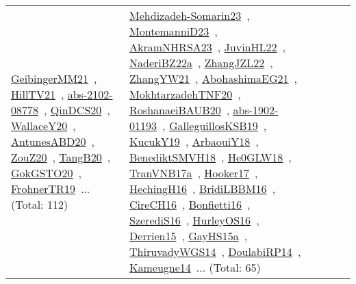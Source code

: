{\begin{longtable}{lp{3cm}>{\raggedright\arraybackslash}p{6cm}>{\raggedright\arraybackslash}p{6cm}>{\raggedright\arraybackslash}p{8cm}}
\href{../works/GeibingerMM21.pdf}{GeibingerMM21}~\cite{GeibingerMM21}, \href{../works/HillTV21.pdf}{HillTV21}~\cite{HillTV21}, \href{../works/abs-2102-08778.pdf}{abs-2102-08778}~\cite{abs-2102-08778}, \href{../works/QinDCS20.pdf}{QinDCS20}~\cite{QinDCS20}, \href{../works/WallaceY20.pdf}{WallaceY20}~\cite{WallaceY20}, \href{../works/AntunesABD20.pdf}{AntunesABD20}~\cite{AntunesABD20}, \href{../works/ZouZ20.pdf}{ZouZ20}~\cite{ZouZ20}, \href{../works/TangB20.pdf}{TangB20}~\cite{TangB20}, \href{../works/GokGSTO20.pdf}{GokGSTO20}~\cite{GokGSTO20}, \href{../works/FrohnerTR19.pdf}{FrohnerTR19}~\cite{FrohnerTR19}... (Total: 112) & \href{../works/Mehdizadeh-Somarin23.pdf}{Mehdizadeh-Somarin23}~\cite{Mehdizadeh-Somarin23}, \href{../works/MontemanniD23.pdf}{MontemanniD23}~\cite{MontemanniD23}, \href{../works/AkramNHRSA23.pdf}{AkramNHRSA23}~\cite{AkramNHRSA23}, \href{../works/JuvinHL22.pdf}{JuvinHL22}~\cite{JuvinHL22}, \href{../works/NaderiBZ22a.pdf}{NaderiBZ22a}~\cite{NaderiBZ22a}, \href{../works/ZhangJZL22.pdf}{ZhangJZL22}~\cite{ZhangJZL22}, \href{../works/ZhangYW21.pdf}{ZhangYW21}~\cite{ZhangYW21}, \href{../works/AbohashimaEG21.pdf}{AbohashimaEG21}~\cite{AbohashimaEG21}, \href{../works/MokhtarzadehTNF20.pdf}{MokhtarzadehTNF20}~\cite{MokhtarzadehTNF20}, \href{../works/RoshanaeiBAUB20.pdf}{RoshanaeiBAUB20}~\cite{RoshanaeiBAUB20}, \href{../works/abs-1902-01193.pdf}{abs-1902-01193}~\cite{abs-1902-01193}, \href{../works/GalleguillosKSB19.pdf}{GalleguillosKSB19}~\cite{GalleguillosKSB19}, \href{../works/KucukY19.pdf}{KucukY19}~\cite{KucukY19}, \href{../works/ArbaouiY18.pdf}{ArbaouiY18}~\cite{ArbaouiY18}, \href{../works/BenediktSMVH18.pdf}{BenediktSMVH18}~\cite{BenediktSMVH18}, \href{../works/He0GLW18.pdf}{He0GLW18}~\cite{He0GLW18}, \href{../works/TranVNB17a.pdf}{TranVNB17a}~\cite{TranVNB17a}, \href{../works/Hooker17.pdf}{Hooker17}~\cite{Hooker17}, \href{../works/HechingH16.pdf}{HechingH16}~\cite{HechingH16}, \href{../works/BridiLBBM16.pdf}{BridiLBBM16}~\cite{BridiLBBM16}, \href{../works/CireCH16.pdf}{CireCH16}~\cite{CireCH16}, \href{../works/Bonfietti16.pdf}{Bonfietti16}~\cite{Bonfietti16}, \href{../works/SzerediS16.pdf}{SzerediS16}~\cite{SzerediS16}, \href{../works/HurleyOS16.pdf}{HurleyOS16}~\cite{HurleyOS16}, \href{../works/Derrien15.pdf}{Derrien15}~\cite{Derrien15}, \href{../works/GayHS15a.pdf}{GayHS15a}~\cite{GayHS15a}, \href{../works/ThiruvadyWGS14.pdf}{ThiruvadyWGS14}~\cite{ThiruvadyWGS14}, \href{../works/DoulabiRP14.pdf}{DoulabiRP14}~\cite{DoulabiRP14}, \href{../works/Kameugne14.pdf}{Kameugne14}~\cite{Kameugne14}... (Total: 65)\\

\end{longtable}}
